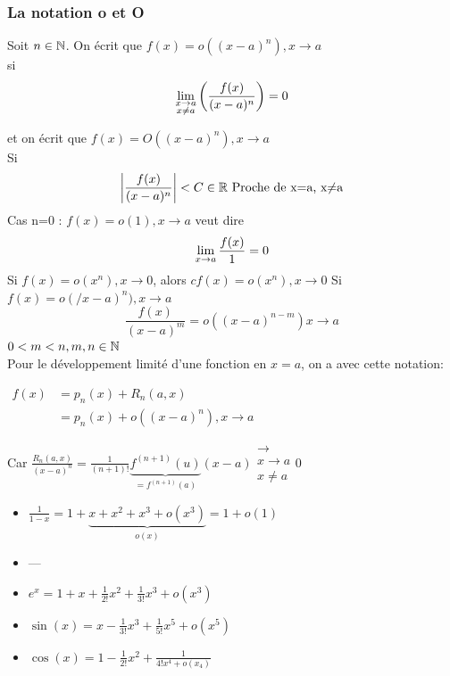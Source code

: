 \documentclass[12pt,a4paper]{article}
\begin{document}
{\subsubsection{La notation o et O}
\begin{boite}
	\Definition Soit $n \in \mathbb{N}$. On écrit que $f(x) = o((x-a)^n), x\to a$\\
	si 
	\begin{equation}
		\lim\limits_{\substack{x\to a \\ x\neq a}}\left(\frac{f(x)}{(x-a)^n}\right) = 0
	\end{equation}
\end{boite}
et on écrit que $f(x) = O((x-a)^n), x\to a$\\
Si
 \begin{equation}
	\left|\frac{f(x)}{(x-a)^n}\right| < C \in \mathbb{R} \text{ Proche de x=a, x$\neq$a}
\end{equation}
 Cas n=0 : $f(x) = o(1), x\to a$ veut dire
\begin{equation}
	 \lim\limits_{x\to a}\frac{f(x)}{1}=0
\end{equation}
 Si $f(x) =o(x^n), x\to 0$, alors $cf(x) = o(x^n), x\to 0$
 Si $f(x) = o(/x-a)^n), x\to a$
\begin{equation}
	\frac{f(x)}{(x-a)^m} = o((x-a)^{n-m}) x\to a
\end{equation}
$0 <m < n, m,n \in \mathbb{N}$\\
Pour le développement limité d'une fonction en $x=a$, on a avec cette notation:
\begin{boite}
$\begin{array}{ll}
	f(x) &= p_n(x)+R_n(a,x) \\
	&= p_n(x)+o((x-a)^n), x\to a
\end{array}$
\end{boite}
Car $\frac{R_n(a,x)}{(x-a)^n} = \frac{1}{(n+1)!}\underbrace{f^{(n+1)}(u)}_{=f^{(n+1)}(a)}(x-a) \substack{\to\\ x\to a\\ x\neq a} 0$
\\
\begin{itemize}
	\item $\frac{1}{1-x} = 1+\underbrace{x+x^2 + x^3 + o(x^3)}_{o(x)} = 1+o(1)$
	\item ---
	\item $e^x=1+x+\frac{1}{2!}x^2 + \frac{1}{3!}x^3+o(x^3)$
	\item $\sin(x) = x-\frac{1}{3!}x^3 +\frac{1}{5!}x^5 + o(x^5)$
	\item $\cos(x) = 1-\frac{1}{2!}x^2+\frac{1}{4!x^4+o(x_4)}$

\end{itemize}}
\end{document}
